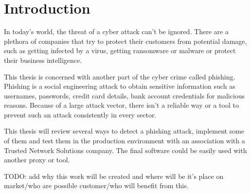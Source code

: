 \documentclass[
  digital, %
  twoside, %
  table,   %
  nolof,     %
  nolot,     %
]{fithesis3}
\begin{document}
\chapter{Introduction}


In today's world, the threat of a cyber attack can't be ignored. There are a plethora of companies that try to protect their customers from potential damage, such as getting infected by a virus, getting ransomware or malware or protect their business intelligence.

This thesis is concerned with another part of the cyber crime called phishing. Phishing is a social engineering attack to obtain sensitive information such as usernames, passwords, credit card details, bank account credentials for malicious reasons. Because of a large attack vector, there isn't a reliable way or a tool to prevent such an attack consistently in every sector.

This thesis will review several ways to detect a phishing attack, implement some of them and test them in the production environment with an association with a Trusted Network Solutions company. The final software could be easily used with another proxy or tool.

TODO: add why this work will be created and where will be it's place on market/who are possible customer/who will benefit from this.







\end{document}
